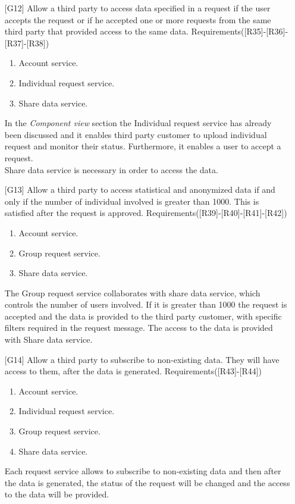 \begin{itemize}
\item[{[G12]}] Allow a third party to access data specified in a request if the user accepts the request or if he accepted one or more requests from the same third party that provided access to the same data. Requirements([R35]-[R36]-[R37]-[R38])
	\begin{enumerate}
	\item Account service.
	\item Individual request service.
	\item Share data service.
	\end{enumerate}
In the \textit{Component view} section the Individual request service has already been discussed and it enables third party customer to upload individual request and monitor their status. Furthermore, it enables a user to accept a request. \\
Share data service is necessary in order to access the data.	
	
\item[{[G13]}] Allow a third party to access statistical and anonymized data if and only if the number of individual involved is greater than 1000. This is satisfied after the request is approved. Requirements([R39]-[R40]-[R41]-[R42])
	\begin{enumerate}
	\item Account service.
	\item Group request service.
	\item Share data service. 
	\end{enumerate}
The Group request service collaborates with share data service, which controls the number of users involved. If it is greater than 1000 the request is accepted and the data is provided to the third party customer, with specific filters required in the request message. 
The access to the data is provided with Share data service.
	
\item[{[G14]}] Allow a third party to subscribe to non-existing data. They will have access to them, after the data is generated. Requirements([R43]-[R44])
	\begin{enumerate}
	\item Account service.
	\item Individual request service.
	\item Group request service.
	\item Share data service.
	\end{enumerate}
Each request service allows to subscribe to non-existing data and then after the data is generated, the status of the request will be changed
and the access to the data will be provided.
\end{itemize}
